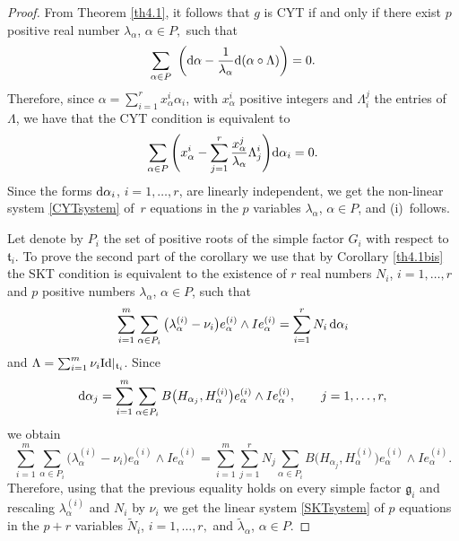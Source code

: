 \documentclass[pdftex]{sigma}
\numberwithin{equation}{section}
\begin{document}
\begin{proof}
From Theorem \ref{th4.1}, it follows that $g$ is CYT if and only if there exist $p$ positive real number $\lambda_{\alpha}$, $\alpha \in P,$ such that
\[
\sum_{\alpha \in P}  \bigg ({\rm d}\alpha - \frac{1}{\lambda_{\alpha} } {\rm d}( \alpha \circ \Lambda ) \bigg) =0.
\]
Therefore, since $\alpha =\sum_{i = 1}^r x_\alpha^i \alpha_i$, with $x_\alpha^i$ positive integers and $\Lambda_i^j$ the entries of $\Lambda$,
 we have that the CYT condition is equivalent to
\[
\sum_{\alpha \in P} \Bigg( x_\alpha^i - \sum_{j=1}^r \frac{x_\alpha^j}{\lambda_{\alpha}} \Lambda^i_j \Bigg) {\rm d}\alpha_i = 0.
\]
Since the forms ${\rm d} \alpha_i$, $i= 1, \dots, r$, are linearly independent, we get the non-linear system \eqref{CYTsystem} of~$r$ equations in the $p$ variables $\lambda_{\alpha}$, $\alpha \in P$, and (i)~follows.

Let denote by $P_i$ the set of positive roots of the simple factor $G_i$ with respect to $\mathfrak t_i$.
To prove the second part of the corollary we use that by Corollary \ref{th4.1bis} the SKT condition is equivalent to the existence of $r$ real numbers $N_i$, $i = 1, \dots, r$ and $p$ positive numbers $\lambda_{\alpha}$, $\alpha \in P$, such that
\[
\sum_{i = 1}^m \sum_{\alpha \in P_i} \big(\lambda_{\alpha}^{(i)} - \nu_i\big) e_{\alpha}^{(i)} \wedge I e_{\alpha}^{(i)} = \sum_{i = 1}^r N_i \, {\rm d}\alpha_i
\]
and $\Lambda = \sum_{i =1}^m \nu_i {\rm Id} |_{\mathfrak t_i}$.
Since
\[
{\rm d}\alpha_j= \sum_{i = 1}^m \sum_{\alpha \in P_i} B\big(H_{\alpha_j}, H_{\alpha}^{(i)}\big) e_{\alpha} ^{(i)} \wedge I e_{\alpha}^{(i)}, \qquad j =1, \dots, r,
\]
we obtain
\[
\sum_{i =1}^m \sum_{\alpha \in P_i} \big(\lambda_{\alpha}^{(i)} - \nu_i\big) e_{\alpha}^{(i)} \wedge I e_{\alpha} ^{(i)}= \sum_{i =1}^m \sum_{j = 1}^r N_j \sum_{\alpha \in P_i} B\big(H_{\alpha_j}, H_{\alpha}^{(i)}\big) e_{\alpha}^{(i)} \wedge I e_{\alpha}^{(i)}.
\]
Therefore, using that the previous equality holds on every simple factor $\mathfrak g_i$ and rescaling $\lambda_{\alpha}^{(i)}$ and $N_i$ by $\nu_i$ we get the linear system \eqref{SKTsystem} of $p$ equations in the $p + r$ variables $\tilde N_i$, $i = 1, \dots, r,$ and $ \tilde \lambda_{\alpha}$, $\alpha \in P.$


\end{proof}
\end{document}
